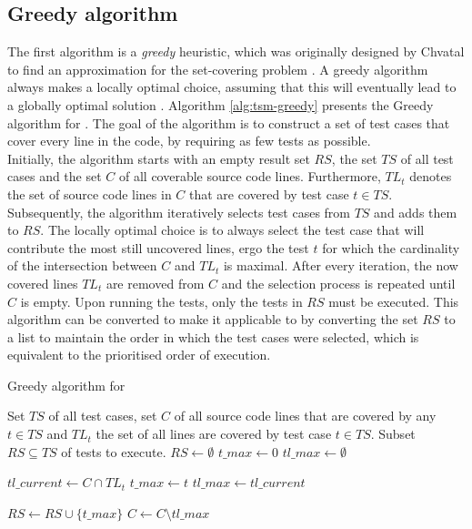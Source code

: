 
\subsection{Greedy algorithm}
\label{ssec:alg-greedy}
The first algorithm is a \emph{greedy} heuristic, which was originally designed by Chvatal to find an approximation for the set-covering problem \cite{evaluationoftestsuiteminimization}. A greedy algorithm always makes a locally optimal choice, assuming that this will eventually lead to a globally optimal solution \cite{10.5555/1614191}. Algorithm \ref{alg:tsm-greedy} presents the Greedy algorithm for \tsm{}. The goal of the algorithm is to construct a set of test cases that cover every line in the code, by requiring as few tests as possible.\\

\noindent Initially, the algorithm starts with an empty result set $RS$, the set $TS$ of all test cases and the set $C$ of all coverable source code lines. Furthermore, $TL_t$ denotes the set of source code lines in $C$ that are covered by test case $t \in TS$. Subsequently, the algorithm iteratively selects test cases from $TS$ and adds them to $RS$. The locally optimal choice is to always select the test case that will contribute the most still uncovered lines, ergo the test $t$ for which the cardinality of the intersection between $C$ and $TL_t$ is maximal. After every iteration, the now covered lines $TL_t$ are removed from $C$ and the selection process is repeated until $C$ is empty. Upon running the tests, only the tests in $RS$ must be executed. This algorithm can be converted to make it applicable to \tcp{} by converting the set $RS$ to a list to maintain the order in which the test cases were selected, which is equivalent to the prioritised order of execution.

\begin{algorithm}[h!]
\caption{Greedy algorithm for \tsm{}}
\label{alg:tsm-greedy}
\begin{algorithmic}[1]
	 Set $TS$ of all test cases, set $C$ of all source code lines that are covered by any $t \in TS$ and $TL_t$ the set of all lines are covered by test case $t \in TS$.
	 Subset $RS \subseteq TS$ of tests to execute.
	\State $RS \gets \emptyset$
		\State $t\_max \gets 0$
		\State $tl\_max \gets \emptyset$
		
			\State $tl\_current \gets C \cap TL_{t}$
				\State $t\_max \gets t$
				\State $tl\_max \gets tl\_current$
			\EndIf
		\EndFor
		
		\State $RS \gets RS \cup \{t\_max\}$
		\State $C \gets C \setminus tl\_max$
	\EndWhile
\end{algorithmic}
\end{algorithm}
